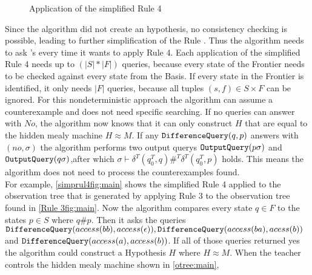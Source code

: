 \begin{figure}
\begin{subfigure}[b]{0.3\textwidth}
	\end{subfigure}
	\caption{Application of the simplified Rule 4}
	\label{simprul4fig:main}
\end{figure}
Since the algorithm did not create an hypothesis, no consistency checking is possible, leading to further simplification of the Rule . Thus the algorithm needs to ask \diffquery's every time it wants to apply Rule 4. Each application of the simplified Rule 4 needs up to $(|S|*|F|)$ queries, because every state of the Frontier needs to be checked against every state from the Basis. If every state in the Frontier is identified, it only needs $|F|$ queries, because all tuples $(s,f)\in S\times F$ can be ignored. For this nondeterministic approach the algorithm can assume a counterexample and does not need specific searching. If no queries can answer with $No$, the algorithm now knows that it can only construct $H$ that are equal to the hidden mealy machine $H\approx M$. If any $\textnormal{\texttt{DifferenceQuery}}(q,p)$ answers with $(no,\sigma)$ the algorithm performs two output querys $\textnormal{\texttt{OutputQuery}}(p\sigma)$ and $\textnormal{\texttt{OutputQuery}}(q\sigma)$,after which $\sigma\vdash\delta^T(q_0^T,q)\#^T\delta^T(q_0^T,p)$ holds. This means the algorithm does not need to process the counterexamples found.\\
For example, \autoref{simprul4fig:main} shows the simplified Rule 4 applied to the observation tree that is generated by applying Rule 3 to the observation tree found in \autoref{Rule 3fig:main}. Now the algorithm compares every state $q\in F$ to the states $p\in S$ where $ q\#p$. Then it asks the queries $\textnormal{\texttt{DifferenceQuery}}(access(bb),access(\epsilon)), \textnormal{\texttt{DifferenceQuery}}(access(ba),acess(b))$ and 
\newline $\textnormal{\texttt{DifferenceQuery}}(access(a),access(b))$. If all of those queries returned yes the algorithm could construct a Hypothesis $H$ where $H\approx M$. When the teacher controls the hidden mealy machine shown in \autoref{otree:main},
